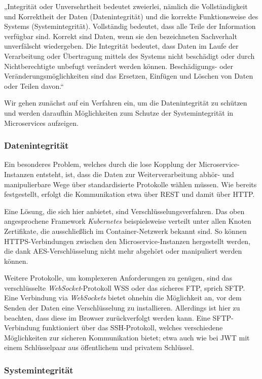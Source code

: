 „Integrität oder Unversehrtheit bedeutet zweierlei, nämlich die Vollständigkeit und Korrektheit der Daten (Datenintegrität) und die korrekte Funktionsweise des Systems (Systemintegrität). Vollständig bedeutet, dass alle Teile der Information verfügbar sind. Korrekt sind Daten, wenn sie den bezeichneten Sachverhalt unverfälscht wiedergeben. Die Integrität bedeutet, dass Daten im Laufe der Verarbeitung oder Übertragung mittels des Systems nicht beschädigt oder durch Nichtberechtigte unbefugt verändert werden können. Beschädigungs- oder Veränderungsmöglichkeiten sind das Ersetzen, Einfügen und Löschen von Daten oder Teilen davon.“ \cite{Bedner+10}

Wir gehen zunächst auf ein Verfahren ein, um die Datenintegrität zu schützen und werden daraufhin Möglichkeiten zum Schutze der Systemintegrität in Microservices aufzeigen.

\subsubsection{Datenintegrität}

Ein besonderes Problem, welches durch die lose Kopplung der Microservice-Instanzen entsteht, ist, dass die Daten zur Weiterverarbeitung abhör- und manipulierbare Wege über standardisierte Protokolle wählen müssen. Wie bereits festgestellt, erfolgt die Kommunikation etwa über REST und damit über HTTP. 

Eine Lösung, die sich hier anbietet, sind Verschlüsselungsverfahren. Das oben angesprochene Framework \textit{Kubernetes} beispielsweise verteilt unter allen Knoten Zertifikate, die ausschließlich im Container-Netzwerk bekannt sind. So können HTTPS-Verbindungen zwischen den Microservice-Instanzen hergestellt werden, die dank AES-Verschlüsselung nicht mehr abgehört oder manipuliert werden können.

Weitere Protokolle, um komplexeren Anforderungen zu genügen, sind das verschlüsselte \textit{WebSocket}-Protokoll WSS oder das sicheres FTP, sprich SFTP. Eine Verbindung via \textit{WebSockets} bietet ohnehin die Möglichkeit an, vor dem Senden der Daten eine Verschlüsselung zu installieren. Allerdings ist hier zu beachten, dass diese im Browser zurückverfolgt werden kann. Eine SFTP-Verbindung funktioniert über das SSH-Protokoll, welches verschiedene Möglichkeiten zur sicheren Kommunikation bietet; etwa auch wie bei JWT mit einem Schlüsselpaar aus öffentlichem und privatem Schlüssel.

\subsubsection{Systemintegrität}

